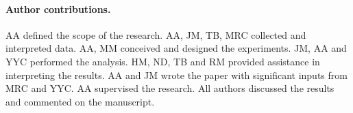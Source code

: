 \documentclass[11pt]{article}
\theoremstyle{definition}
\begin{document}
\paragraph{Author contributions.}
AA defined the scope of the
research. AA, JM, TB, MRC collected and interpreted data.
AA, MM conceived and designed the
experiments. JM, AA and YYC performed the
analysis. HM, ND, TB and RM provided assistance in interpreting the
results. AA and JM wrote the paper with significant inputs from
MRC and YYC. AA supervised the research. All authors discussed the
results and commented on the manuscript.



\end{document}
